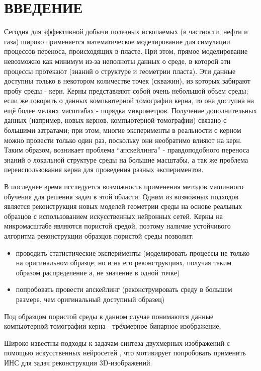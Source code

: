 \clearpage
\section*{\hfil ВВЕДЕНИЕ \hfil}
	
	Сегодня для эффективной добычи полезных ископаемых (в частности, нефти и газа) широко применяется математическое моделирование для симуляции процессов переноса, происходящих в пласте. При этом, прямое моделирование невозможно как минимум из-за неполноты данных о среде, в которой эти процессы протекают (знаний о структуре и геометрии пласта). Эти данные доступны только в некотором количестве точек (скважин), из которых забирают пробу среды - керн. Керны представляют собой очень небольшой объем среды; если же говорить о данных компьютерной томографии керна, то она доступна на ещё более мелких масштабах - порядка микрометров. Получение дополнительных данных (например, новых кернов, компьютерной томографии) связано с большими затратами; при этом, многие эксперименты в реальности с керном можно провести только один раз, поскольку они необратимо влияют на керн. Таким образом, возникает проблема ``апскейлинга'' - правдоподобного переноса знаний о локальной структуре среды на большие масштабы, а так же проблема переиспользования керна для проведения разных экспериментов.
	
	В последнее время исследуется возможность применения методов машинного обучения для решения задач в этой области. Одним из возможных подходов является реконструкция новых моделей геометрии среды на основе реальных образцов с использованием искусственных нейронных сетей. Керны на микромасштабе являются пористой средой, поэтому наличие устойчивого алгоритма реконструкции образцов пористой среды позволит:
	
	\begin{itemize}
		\item проводить статистические эксперименты (моделировать процессы не только на оригинальном образце, но и на его реконструкциях, получая таким образом распределение а, не значение в одной точке)
		\item попробовать провести апскейлинг (реконструировать среду в большем размере, чем оригинальный доступный образец)
	\end{itemize}

	
	Под образцом пористой среды в данном случае понимаются данные компьютерной томографии керна - трёхмерное бинарное изображение.
	
	Широко известны подходы к задачам синтеза двухмерных изображений с помощью искусственных нейросетей \cite{Gatys, Ulyanov}, что мотивирует попробовать применить ИНС для задач реконструкции 3D-изображений.
	
